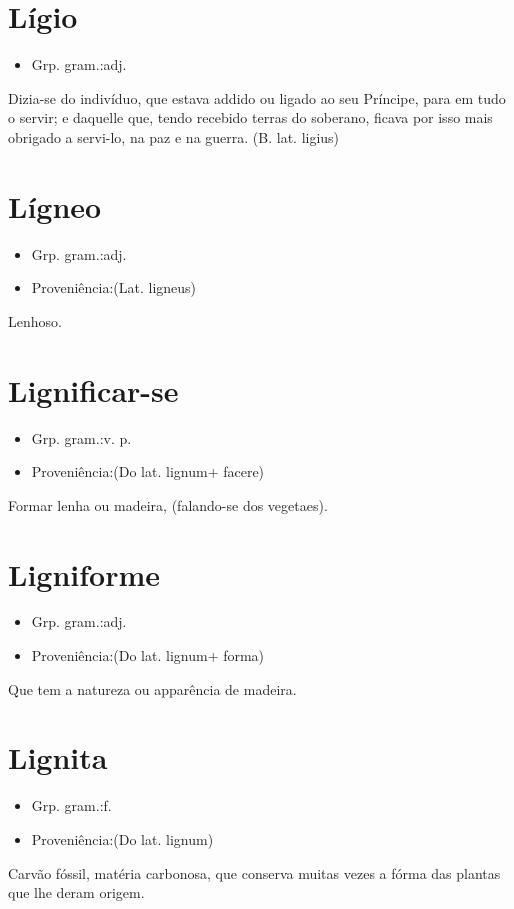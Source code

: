 \section{Lígio}
\begin{itemize}
\item {Grp. gram.:adj.}
\end{itemize}
Dizia-se do indivíduo, que estava addido ou ligado ao seu Príncipe, para em tudo o servir; e daquelle que, tendo recebido terras do soberano, ficava por isso mais obrigado a servi-lo, na paz e na guerra.
(B. lat. \textunderscore ligius\textunderscore )
\section{Lígneo}
\begin{itemize}
\item {Grp. gram.:adj.}
\end{itemize}
\begin{itemize}
\item {Proveniência:(Lat. \textunderscore ligneus\textunderscore )}
\end{itemize}
Lenhoso.
\section{Lignificar-se}
\begin{itemize}
\item {Grp. gram.:v. p.}
\end{itemize}
\begin{itemize}
\item {Proveniência:(Do lat. \textunderscore lignum\textunderscore  + \textunderscore facere\textunderscore )}
\end{itemize}
Formar lenha ou madeira, (falando-se dos vegetaes).
\section{Ligniforme}
\begin{itemize}
\item {Grp. gram.:adj.}
\end{itemize}
\begin{itemize}
\item {Proveniência:(Do lat. \textunderscore lignum\textunderscore  + \textunderscore forma\textunderscore )}
\end{itemize}
Que tem a natureza ou apparência de madeira.
\section{Lignita}
\begin{itemize}
\item {Grp. gram.:f.}
\end{itemize}
\begin{itemize}
\item {Proveniência:(Do lat. \textunderscore lignum\textunderscore )}
\end{itemize}
Carvão fóssil, matéria carbonosa, que conserva muitas vezes a fórma das plantas que lhe deram origem.
